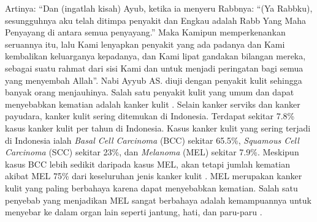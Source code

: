     Artinya: “Dan (ingatlah kisah) Ayub, ketika ia menyeru Rabbnya: “(Ya Rabbku), sesungguhnya aku telah ditimpa penyakit dan Engkau adalah Rabb Yang Maha Penyayang di antara semua penyayang.” Maka Kamipun memperkenankan seruannya itu, lalu Kami lenyapkan penyakit yang ada padanya dan Kami kembalikan keluarganya kepadanya, dan Kami lipat gandakan bilangan mereka, sebagai suatu rahmat dari sisi Kami dan untuk menjadi peringatan bagi semua yang menyembah Allah”. Nabi Ayyub AS. diuji dengan penyakit kulit sehingga banyak orang menjauhinya. Salah satu penyakit kulit yang umum dan dapat menyebabkan kematian adalah kanker kulit \citep{Nurlitasari2022}. Selain kanker serviks dan kanker payudara, kanker kulit sering ditemukan di Indonesia. Terdapat sekitar 7.8\% kasus kanker kulit per tahun di Indonesia. Kasus kanker kulit yang sering terjadi di Indonesia ialah \textit{Basal Cell Carcinoma} (BCC) sekitar 65.5\%, \textit{Squamous Cell Carcinoma} (SCC) sekitar 23\%, dan \textit{Melanoma} (MEL) sekitar 7.9\%. Meskipun kasus BCC lebih sedikit daripada kasus MEL, akan tetapi jumlah kematian akibat MEL 75\% dari keseluruhan jenis kanker kulit \citep{Fuadah2020a}. MEL merupakan kanker kulit yang paling berbahaya karena dapat menyebabkan kematian. Salah satu penyebab yang menjadikan MEL sangat berbahaya adalah kemampuannya untuk menyebar ke dalam organ lain seperti jantung, hati, dan paru-paru \citep{Nugroho2019}.
    
